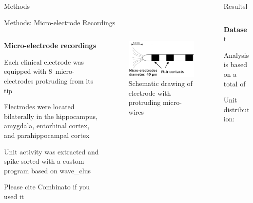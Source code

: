 \documentclass{beamer}
\renewcommand{\emph}{\textbf}
\newenvironment{wideitemize}{\itemize\addtolength{\itemsep}{.2em}\addtolength{\labelsep}{.1ex}}{\enditemize}
\begin{document}
\begin{frame}[t]
\begin{columns}[T]
\begin{column}{.32\linewidth}
\begin{block}{Methods}
\end{block}

\begin{block}{Methods: Micro-electrode Recordings}
\begin{columns}[T]
\begin{column}{.55\linewidth}
\emph{Micro-electrode recordings}
\begin{wideitemize}
\item Each clinical electrode was equipped with 8~micro-electrodes protruding from its tip
\item Electrodes were located bilaterally in the hippocampus, amygdala, entorhinal cortex, and parahippocampal cortex
\item Unit activity was extracted and spike-sorted with a custom program based on wave\_clus \parencite{quian_quiroga_unsupervised_2004}
\item Please cite Combinato if you used it
\end{wideitemize}
\end{column}
\begin{column}{.35\linewidth}
\begin{figure}
\label{fig:electrodes}
\includegraphics[width=.9\linewidth]{electrodes.png}
\caption{Schematic drawing of electrode with protruding micro-wires}
\end{figure}
\end{column}
\end{columns}
\end{block}



\end{column}
\begin{column}{.32\linewidth}

\begin{block}{Resultsl}
\begin{columns}[T]
\begin{column}{.95\linewidth}
\emph{Dataset}
\begin{wideitemize}
\item Analysis is based on a total of 
\item Unit distribution: 
\end{wideitemize}


\end{column}
\end{columns}
\end{block}
\end{column}
\end{columns}
\end{frame}
\end{document}
